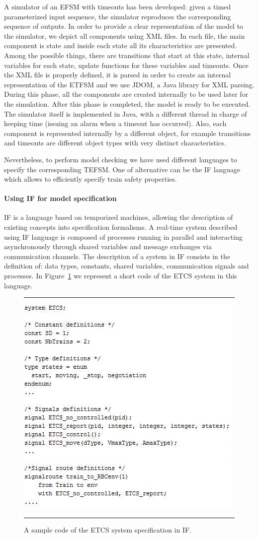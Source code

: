 \documentclass{template/openetcs_article}
\begin{document}
A simulator of an EFSM with timeouts has been developed: given a timed parameterized input sequence,  the simulator reproduces the corresponding sequence of outputs. In order to provide a clear representation of the model to the simulator, we depict all components using XML files. In each file, the main component is state and inside each state all its characteristics are presented. Among the possible things, there are transitions that start at this state, internal variables for each state, update functions for these variables and timeouts.  Once the XML file is properly defined, it is parsed in order to create an internal representation of the ETFSM and we use JDOM, a Java library for XML parsing. During this phase, all the components are created internally to be used later for the simulation. After this phase is completed, the model is ready to be executed. The simulator itself is implemented in Java, with a different thread in charge of keeping time (issuing an alarm when a timeout has occurred). Also, each component is represented internally by a different object, for example transitions and timeouts are different object types with very distinct characteristics. 

Nevertheless, to perform model checking we have used different languages to specify the corresponding TEFSM. One of alternative can be the IF language which allows to efficiently specify train safety properties. 

\paragraph{Using IF for model specification}

IF is a language based on temporized machines, allowing the description of existing concepts into specification formalisms.  A real-time system described using IF language is composed of processes running in parallel and interacting asynchronously through shared variables and message exchanges via communication channels. The description of a system in IF consists in the definition of: data types, constants, shared variables, communication signals and processes. In Figure~\ref{fig:if:specification} we represent a short code of the ETCS system in this language.

\begin{figure}[t]
\hrule
\sspace
\centering
  \includegraphics[width=.5\textwidth]{figures/test_generation.jpg}
  \caption{A sample code of the ETCS system specification in IF.}
  \label{fig:if:specification}
\sspace
\hrule
\end{figure}
\end{document}
